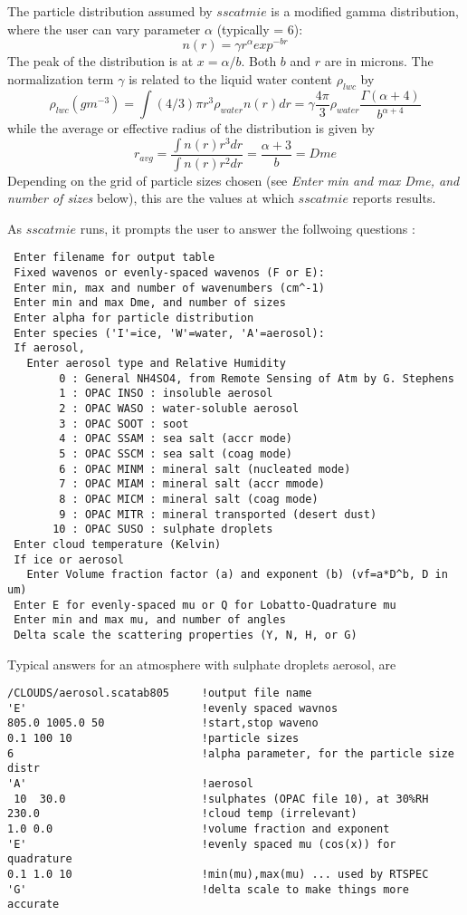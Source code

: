 \documentclass[12pt]{article}
\begin{document}
The particle distribution assumed by $sscatmie$ is a modified gamma 
distribution, where the user can vary parameter $\alpha$ (typically = 6): 
\[
n(r) = \gamma r^{\alpha} exp^{-br}
\]
The peak of the distribution is at $x = \alpha/b$. Both $b$ and $r$ are in 
microns. The normalization term $\gamma$ is related to the liquid water 
content $\rho_{lwc}$ by
\[
\rho_{lwc} (g m^{-3}) = \int (4/3)\pi r^3 \rho_{water} n(r) dr = 
\gamma  \frac{4 \pi}{3} \rho_{water} \frac{\Gamma(\alpha+4)}{b^{\alpha+4}}
\]
while the average or effective radius of the distribution is given by
\[
r_{avg} = \frac{\int n(r) r^3 dr}{\int n(r) r^2 dr} = \frac{\alpha+3}{b} = Dme
\]
Depending on the grid of particle sizes chosen (see {\em Enter min and max 
Dme, and number of sizes} below), this are the values at which $sscatmie$ 
reports results. 

As $sscatmie$ runs, it prompts the user to answer the follwoing questions :
\begin{verbatim}
 Enter filename for output table
 Fixed wavenos or evenly-spaced wavenos (F or E):
 Enter min, max and number of wavenumbers (cm^-1)
 Enter min and max Dme, and number of sizes
 Enter alpha for particle distribution
 Enter species ('I'=ice, 'W'=water, 'A'=aerosol):
 If aerosol, 
   Enter aerosol type and Relative Humidity
        0 : General NH4SO4, from Remote Sensing of Atm by G. Stephens
        1 : OPAC INSO : insoluble aerosol
        2 : OPAC WASO : water-soluble aerosol
        3 : OPAC SOOT : soot
        4 : OPAC SSAM : sea salt (accr mode)
        5 : OPAC SSCM : sea salt (coag mode)
        6 : OPAC MINM : mineral salt (nucleated mode)
        7 : OPAC MIAM : mineral salt (accr mmode)
        8 : OPAC MICM : mineral salt (coag mode)
        9 : OPAC MITR : mineral transported (desert dust)
       10 : OPAC SUSO : sulphate droplets
 Enter cloud temperature (Kelvin)
 If ice or aerosol
   Enter Volume fraction factor (a) and exponent (b) (vf=a*D^b, D in um)
 Enter E for evenly-spaced mu or Q for Lobatto-Quadrature mu
 Enter min and max mu, and number of angles
 Delta scale the scattering properties (Y, N, H, or G)
\end{verbatim}

Typical answers for an atmosphere with sulphate droplets aerosol, are
\begin{verbatim}
/CLOUDS/aerosol.scatab805     !output file name
'E'                           !evenly spaced wavnos
805.0 1005.0 50               !start,stop waveno
0.1 100 10                    !particle sizes
6                             !alpha parameter, for the particle size distr
'A'                           !aerosol   
 10  30.0                     !sulphates (OPAC file 10), at 30%RH
230.0                         !cloud temp (irrelevant)
1.0 0.0                       !volume fraction and exponent
'E'                           !evenly spaced mu (cos(x)) for quadrature
0.1 1.0 10                    !min(mu),max(mu) ... used by RTSPEC
'G'                           !delta scale to make things more accurate
\end{verbatim}
\end{document}
